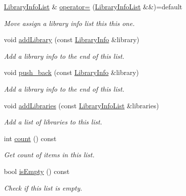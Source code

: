 \begin{DoxyCompactItemize}
\hyperlink{class_mdt_1_1_deploy_utils_1_1_library_info_list}{Library\+Info\+List} \& \hyperlink{class_mdt_1_1_deploy_utils_1_1_library_info_list_a6c572a7666d521fec0aadc0ac1b6ed92}{operator=} (\hyperlink{class_mdt_1_1_deploy_utils_1_1_library_info_list}{Library\+Info\+List} \&\&)=default
\begin{DoxyCompactList}\small\item\em Move assign a library info list this this one. \end{DoxyCompactList}\item 
void \hyperlink{class_mdt_1_1_deploy_utils_1_1_library_info_list_a2fd0bcb2c98ed5a9587e54d6496dac14}{add\+Library} (const \hyperlink{class_mdt_1_1_deploy_utils_1_1_library_info}{Library\+Info} \&library)
\begin{DoxyCompactList}\small\item\em Add a library info to the end of this list. \end{DoxyCompactList}\item 
void \hyperlink{class_mdt_1_1_deploy_utils_1_1_library_info_list_ab2b6f563946dbd690155c7b46e5b94c0}{push\+\_\+back} (const \hyperlink{class_mdt_1_1_deploy_utils_1_1_library_info}{Library\+Info} \&library)
\begin{DoxyCompactList}\small\item\em Add a library info to the end of this list. \end{DoxyCompactList}\item 
void \hyperlink{class_mdt_1_1_deploy_utils_1_1_library_info_list_a08bddbe73a73a1c3b11c1d7633d4ca5c}{add\+Libraries} (const \hyperlink{class_mdt_1_1_deploy_utils_1_1_library_info_list}{Library\+Info\+List} \&libraries)
\begin{DoxyCompactList}\small\item\em Add a list of libraries to this list. \end{DoxyCompactList}\item 
int \hyperlink{class_mdt_1_1_deploy_utils_1_1_library_info_list_a4a43a85999332ac32f738342fc8d832a}{count} () const 
\begin{DoxyCompactList}\small\item\em Get count of items in this list. \end{DoxyCompactList}\item 
bool \hyperlink{class_mdt_1_1_deploy_utils_1_1_library_info_list_a3868a02a4c0d4836f9c90fabde0213db}{is\+Empty} () const 
\begin{DoxyCompactList}\small\item\em Check if this list is empty. \end{DoxyCompactList}\item 

\end{DoxyCompactItemize}
